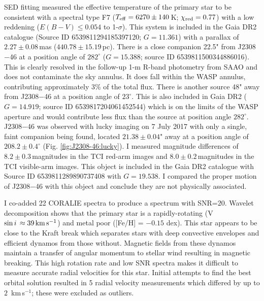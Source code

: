 SED fitting measured the effective temperature of the primary star to be consistent with a spectral type F7 ($T_{\rm eff} = 6270 \pm 140$\,K; $\chi_{\rm red} = 0.77$) with a low reddening ($E(B-V) \leq 0.054$ to 1-$\sigma$). This system is included in the Gaia DR2 catalogue (Source ID 6539811294185397120; $G = 11.361$) with a parallax of $2.27 \pm 0.08$\,mas ($440.78 \pm  15.19$\,pc). There is a close companion  22.5" from J2308$-$46 at a position angle of $282^\circ$ ($G=15.388$; source ID 6539811500344886016). This is clearly resolved in the follow-up 1-m R-band photometry from SAAO and does not contaminate the sky annulus. It does fall within the WASP annulus, contributing approximately 3\% of the total flux. There is another source 48" away from J2308$-$46 at a position angle of $23^\circ$. This is also included in Gaia DR2 ($G = 14.919$; source ID 6539817204061452544) which is on the limits of the WASP aperture and would contribute less flux than the source at position angle $282^\circ$. J2308$-$46 was observed with lucky imaging on 7 July 2017 with only a single, faint companion being found, located $21.38 \pm 0.04$" away at a position angle of $208.2\pm0.4^\circ$ (Fig. \ref{fig:J2308-46:lucky}). I measured magnitude differences of $8.2 \pm 0.3$\,magnitudes in the TCI red-arm images and $8.0\pm0.2$\,magnitudes in the TCI visible-arm images. This object is included in the Gaia DR2 catalogue with Source ID 6539811289890737408 with $G=19.538$. I compared the proper motion of J2308$-$46 
with this object
 and conclude they are not physically associated.

 I co-added 22 CORALIE spectra to produce a spectrum with SNR=$20$. Wavelet decomposition shows that the primary star is a rapidly-rotating (V$\sin i \, \approx 39 \, \rm km\,s^{-1}$) and metal poor ([Fe/H] = $-0.15$ dex). This star appears to be close to the Kraft break \citep{1967ApJ...150..551K} which separates stars with deep convective envelopes and efficient dynamos from those without. Magnetic fields from these dynamos maintain a transfer of angular momentum to stellar wind resulting in magnetic breaking.  This high rotation rate and low SNR spectra makes it difficult to measure accurate radial velocities for this star. Initial attempts to find the best orbital solution resulted in 5 radial velocity measurements which differed by up to $2$\, km\,s$^{-1}$; these were excluded as outliers.


